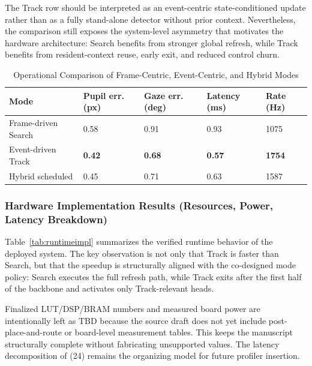 \documentclass[journal]{IEEEtran}
\begin{document}
The Track row should be interpreted as an event-centric state-conditioned update rather than as a fully stand-alone detector without prior context. Nevertheless, the comparison still exposes the system-level asymmetry that motivates the hardware architecture: Search benefits from stronger global refresh, while Track benefits from resident-context reuse, early exit, and reduced control churn.

\begin{table}[t]
\caption{Operational Comparison of Frame-Centric, Event-Centric, and Hybrid Modes}
\label{tab:mode}
\centering
\footnotesize
\begin{tabularx}{\columnwidth}{@{}L{0.30\columnwidth}C{0.14\columnwidth}C{0.14\columnwidth}C{0.14\columnwidth}C{0.14\columnwidth}@{}}
\toprule
Mode & Pupil err. (px) & Gaze err. (deg) & Latency (ms) & Rate (Hz) \\
\midrule
Frame-driven Search & 0.58 & 0.91 & 0.93 & 1075 \\
Event-driven Track & \textbf{0.42} & \textbf{0.68} & \textbf{0.57} & \textbf{1754} \\
Hybrid scheduled & 0.45 & 0.71 & 0.63 & 1587 \\
\bottomrule
\end{tabularx}
\end{table}

\subsubsection{Hardware Implementation Results (Resources, Power, Latency Breakdown)}
Table~\ref{tab:runtimeimpl} summarizes the verified runtime behavior of the deployed system. The key observation is not only that Track is faster than Search, but that the speedup is structurally aligned with the co-designed mode policy: Search executes the full refresh path, while Track exits after the first half of the backbone and activates only Track-relevant heads.

Finalized LUT/DSP/BRAM numbers and measured board power are intentionally left as TBD because the source draft does not yet include post-place-and-route or board-level measurement tables. This keeps the manuscript structurally complete without fabricating unsupported values. The latency decomposition of (24) remains the organizing model for future profiler insertion.
\end{document}
